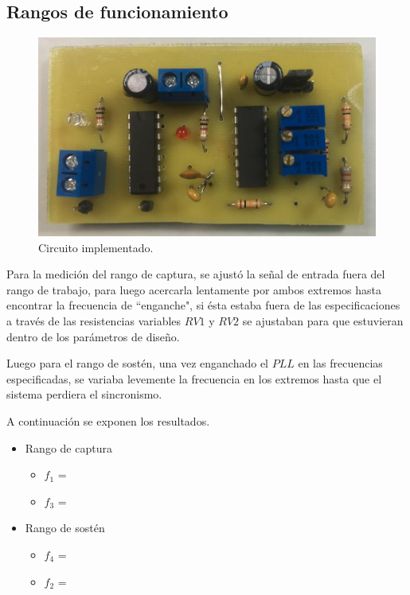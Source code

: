 \documentclass[twocolumn]{article}
\begin{document}
\subsection{Rangos de funcionamiento}
\begin{figure}[H]
  \centering    
  \includegraphics[width=\columnwidth]{imagenes/fig6.jpg}
	\caption{Circuito implementado.}\label{fig:fig6}
\end{figure}

Para la medición del rango de captura, se ajustó la señal de entrada fuera del rango de trabajo, para luego acercarla lentamente por ambos extremos hasta encontrar la frecuencia de ``enganche", si ésta estaba fuera de las especificaciones a través de las resistencias variables $RV1$ y $RV2$ se ajustaban para que estuvieran dentro de los parámetros de diseño.

Luego para el rango de sostén, una vez enganchado el $PLL$ en las frecuencias especificadas, se variaba levemente la frecuencia en los extremos hasta que el sistema perdiera el sincronismo.

A continuación se exponen los resultados.
\begin{itemize}
	\item Rango de captura
		\begin{itemize}
			\item $f_1$ = 
			\item $f_3$ = 
		\end{itemize}
	\item Rango de sostén
		\begin{itemize}
		  \item $f_4$ = 
		  \item $f_2$ =
		\end{itemize}
\end{itemize}
\end{document}

